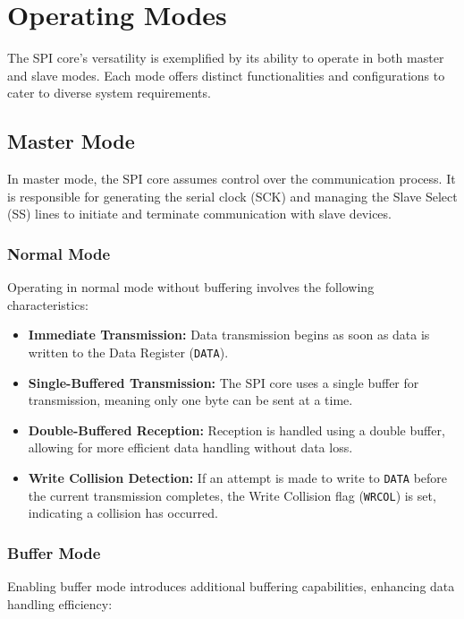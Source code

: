 \section{Operating Modes}
The SPI core's versatility is exemplified by its ability to operate in both master and slave modes. Each mode offers distinct functionalities and configurations to cater to diverse system requirements.

\subsection{Master Mode}
In master mode, the SPI core assumes control over the communication process. It is responsible for generating the serial clock (SCK) and managing the Slave Select (SS) lines to initiate and terminate communication with slave devices.

\subsubsection{Normal Mode}
Operating in normal mode without buffering involves the following characteristics:

\begin{itemize}
    \item \textbf{Immediate Transmission:} Data transmission begins as soon as data is written to the Data Register (\texttt{DATA}).
    \item \textbf{Single-Buffered Transmission:} The SPI core uses a single buffer for transmission, meaning only one byte can be sent at a time.
    \item \textbf{Double-Buffered Reception:} Reception is handled using a double buffer, allowing for more efficient data handling without data loss.
    \item \textbf{Write Collision Detection:} If an attempt is made to write to \texttt{DATA} before the current transmission completes, the Write Collision flag (\texttt{WRCOL}) is set, indicating a collision has occurred.
\end{itemize}

\subsubsection{Buffer Mode}
Enabling buffer mode introduces additional buffering capabilities, enhancing data handling efficiency:

